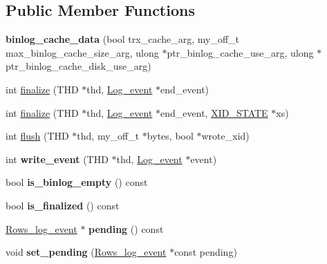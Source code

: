 \subsection*{Public Member Functions}
\begin{DoxyCompactItemize}
\item 
\mbox{\label{classbinlog__cache__data_a6debe02d1cbcd48789c9f4222a9ad965}} 
{\bfseries binlog\+\_\+cache\+\_\+data} (bool trx\+\_\+cache\+\_\+arg, my\+\_\+off\+\_\+t max\+\_\+binlog\+\_\+cache\+\_\+size\+\_\+arg, ulong $\ast$ptr\+\_\+binlog\+\_\+cache\+\_\+use\+\_\+arg, ulong $\ast$ptr\+\_\+binlog\+\_\+cache\+\_\+disk\+\_\+use\+\_\+arg)
\item 
int \mbox{\hyperlink{group__Binary__Log_ga3367fa8c1daced18065f6b9dea5385fe}{finalize}} (T\+HD $\ast$thd, \mbox{\hyperlink{classLog__event}{Log\+\_\+event}} $\ast$end\+\_\+event)
\item 
int \mbox{\hyperlink{group__Binary__Log_ga16bd8b16b092443137c073f18c7e11e4}{finalize}} (T\+HD $\ast$thd, \mbox{\hyperlink{classLog__event}{Log\+\_\+event}} $\ast$end\+\_\+event, \mbox{\hyperlink{classXID__STATE}{X\+I\+D\+\_\+\+S\+T\+A\+TE}} $\ast$xs)
\item 
int \mbox{\hyperlink{group__Binary__Log_ga302d2ea7bfcbea015c329edacdac6c5a}{flush}} (T\+HD $\ast$thd, my\+\_\+off\+\_\+t $\ast$bytes, bool $\ast$wrote\+\_\+xid)
\item 
int {\bfseries write\+\_\+event} (T\+HD $\ast$thd, \mbox{\hyperlink{classLog__event}{Log\+\_\+event}} $\ast$event)
\item 
\mbox{\label{classbinlog__cache__data_ae2ab0898b4570a3bfb462ee6b770c6c9}} 
bool {\bfseries is\+\_\+binlog\+\_\+empty} () const
\item 
\mbox{\label{classbinlog__cache__data_aa4a0799adea7a97c40fb39de0d024e61}} 
bool {\bfseries is\+\_\+finalized} () const
\item 
\mbox{\label{classbinlog__cache__data_a6ec1156fd2bb61caa8d880a54c5e0c0b}} 
\mbox{\hyperlink{classRows__log__event}{Rows\+\_\+log\+\_\+event}} $\ast$ {\bfseries pending} () const
\item 
\mbox{\label{classbinlog__cache__data_ab36c24b642606d3a41f720395ce11cde}} 
void {\bfseries set\+\_\+pending} (\mbox{\hyperlink{classRows__log__event}{Rows\+\_\+log\+\_\+event}} $\ast$const pending)

\end{DoxyCompactItemize}
